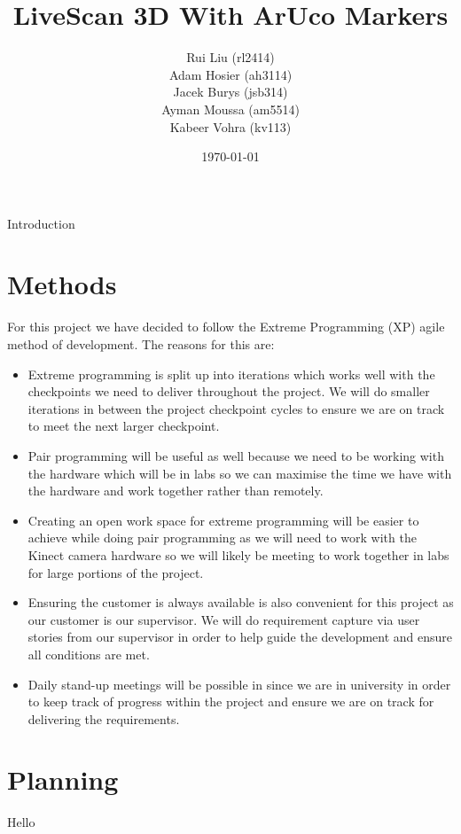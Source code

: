 \documentclass[a4paper,12pt]{article}
\title{LiveScan 3D With ArUco Markers}
\author{Rui Liu (rl2414)\\Adam Hosier (ah3114)\\Jacek Burys (jsb314)\\Ayman Moussa (am5514)\\Kabeer Vohra (kv113)}
\date{\today}
\begin{document}
\maketitle
Introduction

\section*{Methods}
For this project we have decided to follow the Extreme Programming (XP) agile method of development. The reasons for this are:

\begin{itemize}
\item Extreme programming is split up into iterations which works well with the checkpoints we need to deliver throughout the project. We will do smaller iterations in between the project checkpoint cycles to ensure we are on track to meet the next larger checkpoint.
\item Pair programming will be useful as well because we need to be working with the hardware which will be in labs so we can maximise the time we have with the hardware and work together rather than remotely.
\item Creating an open work space for extreme programming will be easier to achieve while doing pair programming as we will need to work with the Kinect camera hardware so we will likely be meeting to work together in labs for large portions of the project.
\item Ensuring the customer is always available is also convenient for this project as our customer is our supervisor. We will do requirement capture via user stories from our supervisor in order to help guide the development and ensure all conditions are met.
\item Daily stand-up meetings will be possible in since we are in university in order to keep track of progress within the project and ensure we are on track for delivering the requirements.
\end{itemize}

\section*{Planning}
Hello
\end{document}
